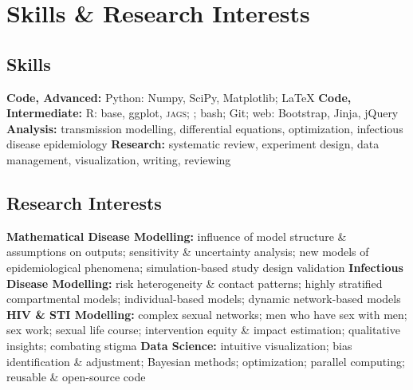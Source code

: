 \section{Skills \& Research Interests}\nodate
\subsection{Skills}
\bullet \textbf{Code, Advanced:} Python: Numpy, SciPy, Matplotlib; \LaTeX
\bullet \textbf{Code, Intermediate:} R: base, ggplot, \textsc{jags}; \matlab; bash; Git; web: Bootstrap, Jinja, jQuery
\bullet \textbf{Analysis:} transmission modelling, differential equations, optimization, infectious disease epidemiology
\bullet \textbf{Research:} systematic review, experiment design, data management, visualization, writing, reviewing
\subsection{Research Interests}\nodate
\bullet \textbf{Mathematical Disease Modelling:}
        influence of model structure \& assumptions on outputs;
        sensitivity \& uncertainty analysis;
        new models of epidemiological phenomena;
        simulation-based study design validation
\bullet \textbf{Infectious Disease Modelling:}
        risk heterogeneity \& contact patterns;
        highly stratified compartmental models;
        individual-based models;
        dynamic network-based models
\bullet \textbf{HIV \& STI Modelling:}
        complex sexual networks;
        men who have sex with men;
        sex work;
        sexual life course;
        intervention equity \& impact estimation;
        qualitative insights;
        combating stigma
\bullet \textbf{Data Science:}
        intuitive visualization;
        bias identification \& adjustment;
        Bayesian methods;
        optimization;
        parallel computing;
        reusable \& open-source code
